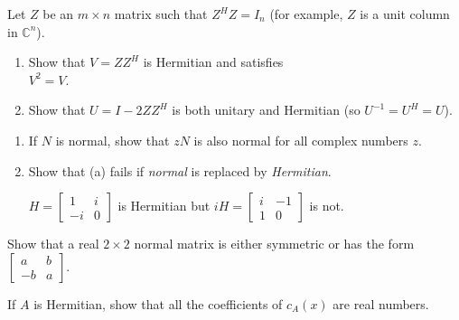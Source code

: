 \documentclass{ximera}
\begin{document}
\begin{problem}\label{prb:complex_matrices17}
Let $Z$ be an $m \times n$ matrix such that $Z^{H}Z = I_{n}$ (for example, $Z$ is a unit column in $\mathbb{C}^n$).

\begin{enumerate}
\item Show that $V = ZZ^{H}$ is Hermitian and satisfies \\ $V^{2} = V$.

\item Show that $U = I - 2ZZ^{H}$ is both unitary and Hermitian (so $U^{-1} = U^{H} = U$).

\end{enumerate}
\end{problem}

\begin{problem}\label{prb:complex_matrices18}
\begin{enumerate}
\item If $N$ is normal, show that $zN$ is also normal for all complex numbers $z$.

\item Show that (a) fails if \textit{normal} is replaced by \textit{Hermitian}.
\begin{hint}
$H = \left[ \begin{array}{rr}
1 & i \\
-i & 0
\end{array}\right]$ is Hermitian but $iH = \left[ \begin{array}{rr}
i & -1 \\
1 & 0
\end{array}\right]$ is not.
\end{hint}
\end{enumerate}
\end{problem}

\begin{problem}\label{prb:complex_matrices19}
Show that a real $2 \times 2$ normal matrix is either symmetric or has the form $\left[ \begin{array}{rr}
a & b \\
-b & a
\end{array}\right]$.
\end{problem}

\begin{problem}\label{prb:complex_matrices20}
If $A$ is Hermitian, show that all the coefficients of $c_{A}(x)$ are real numbers.
\end{problem}
\end{document}
